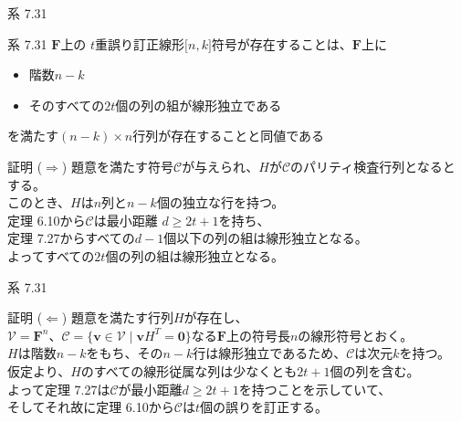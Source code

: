 \documentclass[dvipdfmx,10pt,jsarticle]{beamer}
\newcommand{\F}{\mathbf{F}}
\newcommand{\code}[1]{\mathcal{#1}}
\newcommand{\vs}[1]{\mathcal{#1}}
\newcommand{\sets}[1]{\lbrace{}  #1 \rbrace}
\newcommand{\bracket}[1]{\lbrack{} #1 \rbrack}
\renewcommand{\vec}[1]{\mathbf{#1}}
\begin{document}
  \begin{frame}{系 7.31}
    \begin{block}{系 7.31}
      $\F$上の $t$重誤り訂正線形$\bracket{n,k}$符号が存在することは、$\F$上に \\
      \begin{itemize}
        \item 階数$n-k$
        \item そのすべての$2t$個の列の組が線形独立である
      \end{itemize}
      を満たす$(n - k) \times n$行列が存在することと同値である
    \end{block}
    \begin{block}{証明 ($\Rightarrow$)}
      題意を満たす符号$\code{C}$が与えられ、$H$が$\code{C}$のパリティ検査行列となるとする。 \\
      このとき、$H$は$n$列と$n-k$個の独立な行を持つ。 \\
      定理 6.10から$\code{C}$は最小距離 $d \geq 2t + 1$を持ち、 \\
      定理 7.27からすべての$d - 1$個以下の列の組は線形独立となる。 \\
      よってすべての$2t$個の列の組は線形独立となる。
    \end{block}
  \end{frame}
  \begin{frame}{系 7.31}
    \begin{block}{証明 ($\Leftarrow$)}
      題意を満たす行列$H$が存在し、 \\
      $\vs{V} = \F^n$、$\code{C} = \sets{\vec{v} \in \vs{V} \mid \vec{v} H^T = \vec{0}}$なる$\F$上の符号長$n$の線形符号とおく。 \\
      $H$は階数$n-k$をもち、その$n-k$行は線形独立であるため、$\code C$は次元$k$を持つ。 \\
      仮定より、$H$のすべての線形従属な列は少なくとも$2t+1$個の列を含む。 \\
      よって定理 7.27は$\code{C}$が最小距離$d \geq 2t + 1$を持つことを示していて、\\
      そしてそれ故に定理 6.10から$\code{C}$は$t$個の誤りを訂正する。
    \end{block}
  \end{frame}
\end{document}
